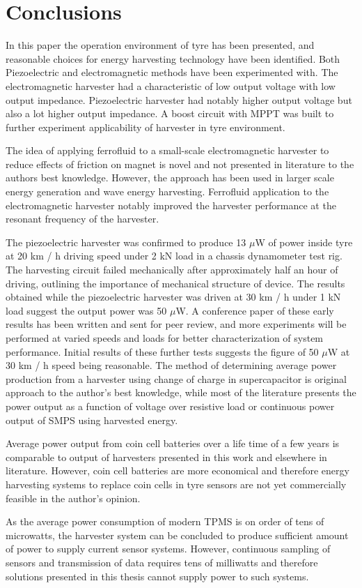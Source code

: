 \section{Conclusions}\label{sect:conclusions}
In this paper the operation environment of tyre has been presented, and reasonable choices for energy harvesting technology have been identified. Both Piezoelectric and electromagnetic methods have been experimented with. The electromagnetic harvester had a characteristic of low output voltage with low output impedance. Piezoelectric harvester had notably higher output voltage but also a lot higher output impedance. A boost circuit with MPPT was built to further experiment applicability of harvester in tyre environment. 

The idea of applying ferrofluid to a small-scale electromagnetic harvester to reduce effects of friction on magnet is novel and not presented in literature to the authors best knowledge. However, the approach has been used in larger scale energy generation and wave energy harvesting. Ferrofluid application to the electromagnetic harvester notably improved the harvester performance at the resonant frequency of the harvester. 

The piezoelectric harvester was confirmed to produce 13 $\mu$W of power inside tyre at 20 km / h driving speed under 2 kN load in a chassis dynamometer test rig. The harvesting circuit failed mechanically after approximately half an hour of driving, outlining the importance of mechanical structure of device. The results obtained while the piezoelectric harvester was driven at 30 km / h under 1 kN load suggest the output power was 50 $\mu$W. A conference paper of these early results has been written and sent for peer review, and more experiments will be performed at varied speeds and loads for better characterization of system performance. Initial results of these further tests suggests the figure of 50 $\mu$W at 30 km / h speed being reasonable. The method of determining average power production from a harvester using change of charge in supercapacitor is original approach to the author's best knowledge, while most of the literature presents the power output as a function of voltage over resistive load or continuous power output of SMPS using harvested energy.  

Average power output from coin cell batteries over a life time of a few years is comparable to output of harvesters presented in this work and elsewhere in literature. However, coin cell batteries are more economical and therefore energy harvesting systems to replace coin cells in tyre sensors are not yet commercially feasible in the author's opinion.

As the average power consumption of modern TPMS is on order of tens of microwatts, the harvester system can be concluded to produce sufficient amount of power to supply current sensor systems. However, continuous sampling of sensors and transmission of data requires tens of milliwatts and therefore solutions presented in this thesis cannot supply power to such systems. 
